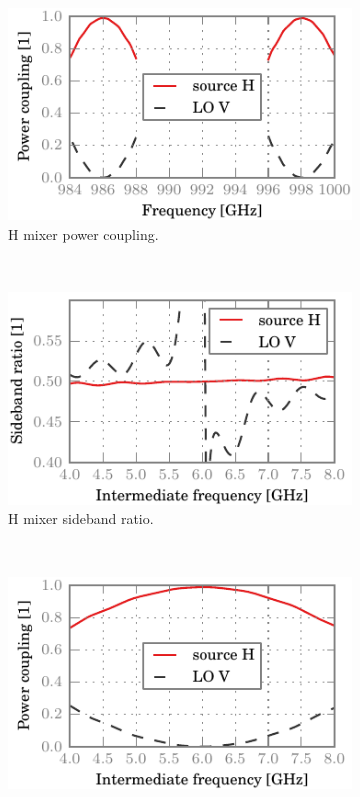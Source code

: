 \begin{figure}[hbtp]
    \centering
    \begin{subfigure}[b]{.5\textwidth}
        \includegraphics{chapter_3/03_mh_cr_h_dsb}%
        \caption{H mixer power coupling.}
    \end{subfigure}%
    \\
    \begin{subfigure}[b]{.5\textwidth}
        \includegraphics{chapter_3/03_mh_cr_h_sbr}%
        \caption{H mixer sideband ratio.}
    \end{subfigure}%
    \\
    \begin{subfigure}[b]{.5\textwidth}
        \includegraphics{chapter_3/03_mh_cr_h_ssb}%

\end{subfigure}
\end{figure}
